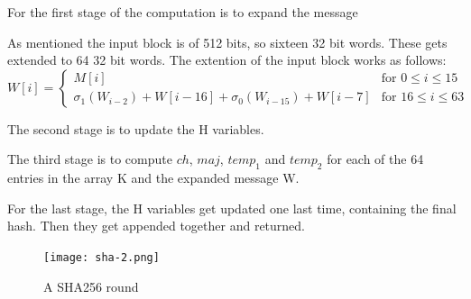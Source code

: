 \documentclass[a4paper, openany]{memoir}
\begin{document}
\begin{abstact}
For the first stage of the computation is to expand the message

As mentioned the input block is of 512 bits, so sixteen 32 bit words. These gets extended to 64 32 bit words.
The extention of the input block works as follows:
\begin{equation}
  W[i] =
  \begin{cases}
    M[i]  &\text{for } 0 \leq i \leq 15\\
    \sigma_1(W_{i-2}) + W[i-16] + \sigma_0(W_{i-15}) + W[i-7] &\text{for } 16 \leq i \leq 63
  \end{cases}
\end{equation}

The second stage is to update the H variables.

The third stage is to compute \(ch\), \(maj\), \(temp_1\) and \(temp_2\) for each of the 64 entries in the array K and the expanded message W.

For the last stage, the H variables get updated one last time, containing the final hash. Then they get appended together and returned.

\begin{figure}[H]
\centering
\texttt{[image: sha-2.png]}
\caption{A SHA256 round}
\label{fig:sha256round}
\end{figure}

\end{abstact}
\end{document}
